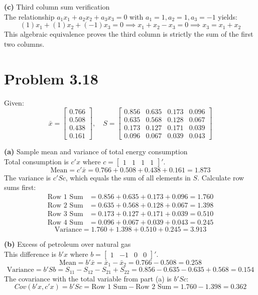 \documentclass{article}
\begin{document}
\noindent \textbf{(c)} Third column sum verification \\
The relationship $a_1 x_1 + a_2 x_2 + a_3 x_3 = 0$ with $a_1=1, a_2=1, a_3=-1$ yields:
\[
(1)x_1 + (1)x_2 + (-1)x_3 = 0 \implies x_1 + x_2 - x_3 = 0 \implies x_3 = x_1 + x_2
\]
This algebraic equivalence proves the third column is strictly the sum of the first two columns.

\hrulefill

\section*{Problem 3.18}
Given:
\[
\bar{x} = \begin{bmatrix} 0.766 \\ 0.508 \\ 0.438 \\ 0.161 \end{bmatrix}, \quad
S = \begin{bmatrix} 0.856 & 0.635 & 0.173 & 0.096 \\ 0.635 & 0.568 & 0.128 & 0.067 \\ 0.173 & 0.127 & 0.171 & 0.039 \\ 0.096 & 0.067 & 0.039 & 0.043 \end{bmatrix}
\]

\noindent \textbf{(a)} Sample mean and variance of total energy consumption \\
Total consumption is $c'x$ where $c = \begin{bmatrix} 1 & 1 & 1 & 1 \end{bmatrix}'$.
\[
\text{Mean} = c'\bar{x} = 0.766 + 0.508 + 0.438 + 0.161 = 1.873
\]
The variance is $c'Sc$, which equals the sum of all elements in $S$. Calculate row sums first:
\begin{align*}
\text{Row 1 Sum} &= 0.856 + 0.635 + 0.173 + 0.096 = 1.760 \\
\text{Row 2 Sum} &= 0.635 + 0.568 + 0.128 + 0.067 = 1.398 \\
\text{Row 3 Sum} &= 0.173 + 0.127 + 0.171 + 0.039 = 0.510 \\
\text{Row 4 Sum} &= 0.096 + 0.067 + 0.039 + 0.043 = 0.245
\end{align*}
\[
\text{Variance} = 1.760 + 1.398 + 0.510 + 0.245 = 3.913
\]

\noindent \textbf{(b)} Excess of petroleum over natural gas \\
This difference is $b'x$ where $b = \begin{bmatrix} 1 & -1 & 0 & 0 \end{bmatrix}'$.
\[
\text{Mean} = b'\bar{x} = \bar{x}_1 - \bar{x}_2 = 0.766 - 0.508 = 0.258
\]
\[
\text{Variance} = b'Sb = S_{11} - S_{12} - S_{21} + S_{22} = 0.856 - 0.635 - 0.635 + 0.568 = 0.154
\]
The covariance with the total variable from part (a) is $b'Sc$:
\[
Cov(b'x, c'x) = b'Sc = \text{Row 1 Sum} - \text{Row 2 Sum} = 1.760 - 1.398 = 0.362
\]
\end{document}
